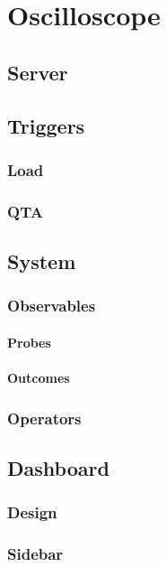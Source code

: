 \chapter{Oscilloscope}
    
    
    
    \section{Server}
     
    \section{Triggers}
        \subsection{Load}
        \subsection{QTA}

    
    
    
    \section{System}
        \subsection{Observables}
            \subsubsection{Probes}
            \subsubsection{Outcomes}
        \subsection{Operators}
   \section{Dashboard}
        \subsection{Design}
        \subsection{Sidebar}
